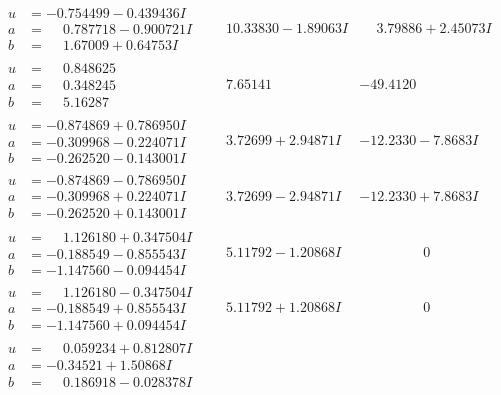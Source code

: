 \documentclass[1p]{elsarticle_modified}
\theoremstyle{definition}
\begin{document}
$$\begin{array}{c|c|c}
\begin{aligned}
u &= -0.754499 - 0.439436 I \\
a &= \phantom{-}0.787718 - 0.900721 I \\
b &= \phantom{-}1.67009 + 0.64753 I\end{aligned}
 & \phantom{-}10.33830 - 1.89063 I & \phantom{-}3.79886 + 2.45073 I \\ \hline\begin{aligned}
u &= \phantom{-}0.848625\phantom{ +0.000000I} \\
a &= \phantom{-}0.348245\phantom{ +0.000000I} \\
b &= \phantom{-}5.16287\phantom{ +0.000000I}\end{aligned}
 & \phantom{-}7.65141\phantom{ +0.000000I} & -49.4120\phantom{ +0.000000I} \\ \hline\begin{aligned}
u &= -0.874869 + 0.786950 I \\
a &= -0.309968 - 0.224071 I \\
b &= -0.262520 - 0.143001 I\end{aligned}
 & \phantom{-}3.72699 + 2.94871 I & -12.2330 - 7.8683 I \\ \hline\begin{aligned}
u &= -0.874869 - 0.786950 I \\
a &= -0.309968 + 0.224071 I \\
b &= -0.262520 + 0.143001 I\end{aligned}
 & \phantom{-}3.72699 - 2.94871 I & -12.2330 + 7.8683 I \\ \hline\begin{aligned}
u &= \phantom{-}1.126180 + 0.347504 I \\
a &= -0.188549 - 0.855543 I \\
b &= -1.147560 - 0.094454 I\end{aligned}
 & \phantom{-}5.11792 - 1.20868 I & \phantom{-0.000000 } 0 \\ \hline\begin{aligned}
u &= \phantom{-}1.126180 - 0.347504 I \\
a &= -0.188549 + 0.855543 I \\
b &= -1.147560 + 0.094454 I\end{aligned}
 & \phantom{-}5.11792 + 1.20868 I & \phantom{-0.000000 } 0 \\ \hline\begin{aligned}
u &= \phantom{-}0.059234 + 0.812807 I \\
a &= -0.34521 + 1.50868 I \\
b &= \phantom{-}0.186918 - 0.028378 I\end{aligned}

\end{array}$$
\end{document}

